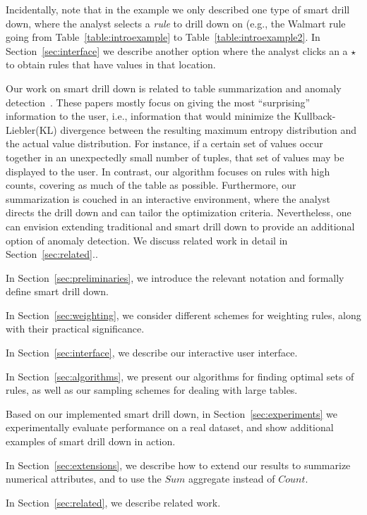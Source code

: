 Incidentally, note that in the example we only described one type of smart drill down,
where the analyst selects a {\em rule} to drill down on
(e.g., the Walmart rule going from Table~\ref{table:introexample} to
Table~\ref{table:introexample2}.
In Section~\ref{sec:interface} we describe another option
where the analyst clicks an a $\star$ to obtain
rules that have values in that location.

Our work on smart drill down is related
to table summarization and anomaly
detection~\cite{Sarawagi:2001:UMA:767141.767148,
Sarawagi00user-adaptiveexploration,
Sarawagi98discovery-drivenexploration,
DBLP:journals/pvldb/GebalyAGKS14}.
These papers mostly focus on
giving the most ``surprising'' information to the user, i.e., information
that would minimize the Kullback-Liebler(KL) divergence between the
resulting maximum entropy distribution and the actual value distribution. For instance, if a certain set of
values occur together in an unexpectedly small number of tuples, that
set of values may be displayed to the user. In contrast, our algorithm
focuses on rules with high counts, covering as
much of the table as possible.
Furthermore, our summarization is couched in
an interactive environment, where the analyst
directs the drill down and can tailor the optimization criteria.
Nevertheless, one can envision extending traditional
and smart drill down to provide an additional option of anomaly detection. We discuss related work in detail in  Section~\ref{sec:related}..



\squishlist 

\item In Section~\ref{sec:preliminaries}, we introduce the relevant
notation and formally define smart drill down.

\item In Section~\ref{sec:weighting}, we consider different schemes
for weighting rules, along with their practical significance.

\item In Section~\ref{sec:interface}, we describe our
interactive user interface. 
  
\item In Section~\ref{sec:algorithms}, we present our algorithms for
finding optimal sets of rules, as well as our sampling schemes
for dealing with large tables.

\item Based on our implemented smart drill down,
in Section~\ref{sec:experiments} we experimentally evaluate
performance on a real dataset,
and show additional examples of smart drill down in action.

\item In Section~\ref{sec:extensions}, we describe how to extend our results to summarize numerical attributes, and to use the $Sum$ aggregate instead of $Count$.

\item In Section~\ref{sec:related}, we describe related work.
\squishend 
